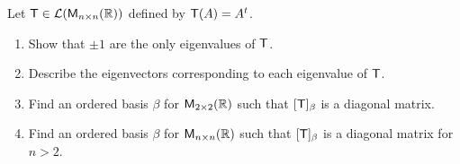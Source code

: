 \begin{ex}\label{ex:5.1.17}
	Let \(\mathsf{T} \in \mathcal{L}(\mathsf{M}_{{n} \times n}({\mathbb{R}}))\) defined by \(\mathsf{T}(A) = {A}^{t}\).
	\begin{enumerate}
		\item Show that \(\pm 1\) are the only eigenvalues of \(\mathsf{T}\).
		\item Describe the eigenvectors corresponding to each eigenvalue of \(\mathsf{T}\).
		\item Find an ordered basis \(\beta\) for \(\mathsf{M}_{{2} \times 2}({\mathbb{R}})\) such that \([\mathsf{T}]_{\beta}\) is a diagonal matrix.
		\item Find an ordered basis \(\beta\) for \(\mathsf{M}_{{n} \times n}({\mathbb{R}})\) such that \([\mathsf{T}]_{\beta}\) is a diagonal matrix for \(n > 2\).
	\end{enumerate}
\end{ex}


